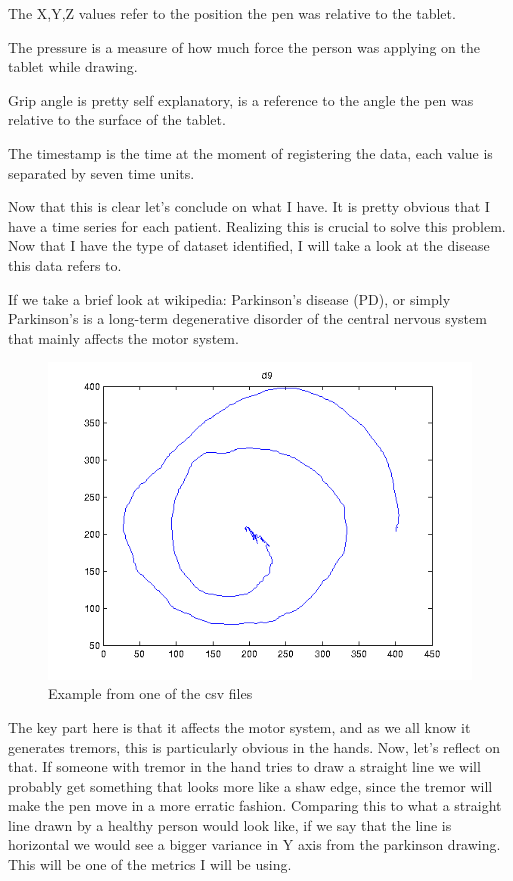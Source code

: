 \documentclass{article} %
\begin{document}
The X,Y,Z values refer to the position the pen was relative to the tablet.

The pressure is a measure of how much force the person was applying on the tablet while drawing.

Grip angle is pretty self explanatory, is a reference to the angle the pen was relative to the surface of the tablet.

The timestamp is the time at the moment of registering the data, each value is separated by seven time units.

Now that this is clear let's conclude on what I have. It is pretty obvious that I have a time series for each patient. Realizing this is crucial to solve this problem. Now that I have the type of dataset identified, I will take a look at the disease this data refers to. 

If we take a brief look at wikipedia: Parkinson's disease (PD), or simply Parkinson's is a long-term degenerative disorder of the central nervous system that mainly affects the motor system.

\bigskip
\bigskip
\bigskip


\begin{figure}[h!]
  \includegraphics[scale = 1]{d9.png}
  \centering
  \caption{Example from one of the csv files}\hspace*{\fill}
  \label{fig:a}
\end{figure}


The key part here is that it affects the motor system, and as we all know it generates tremors, this is particularly obvious in the hands. Now, let's reflect on that. If someone with tremor in the hand tries to draw a straight line we will probably get something that looks more like a shaw edge, since the tremor will make the pen move in a more erratic fashion. Comparing this to what a straight line drawn by a healthy person would look like, if we say that the line is horizontal we would see a bigger variance in Y axis from the parkinson drawing. This will be one of the metrics I will be using.
\end{document}
